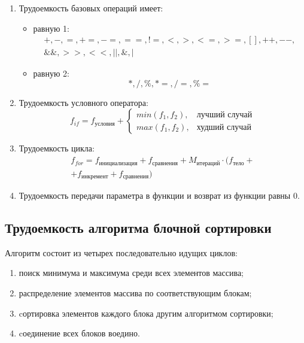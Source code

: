 \begin{enumerate}[label={\arabic*)}]
	\item Трудоемкость базовых операций имеет:
	\begin{itemize}[label=---]
		\item равную 1:
		\begin{equation}
			\label{for:operations_1}
			\begin{gathered}
				+, -, =, +=, -=, ==, !=, <, >, <=, >=, [], ++, {-}-,\\
				\&\&, >>, <<, ||, \&, |
			\end{gathered}
		\end{equation}
		\item равную 2:
		\begin{equation}
			\label{for:operations_2}
			*, /, \%, *=, /=, \%=
		\end{equation}
	\end{itemize}
	\item Трудоемкость условного оператора:
	\begin{equation}
		\label{for:if}
		f_{if} = f_{\text{условия}} + 
		\begin{cases}
			min(f_1, f_2), & \text{лучший случай}\\
			max(f_1, f_2), & \text{худший случай}
		\end{cases}
	\end{equation}
	\item Трудоемкость цикла:
	\begin{equation}
		\label{for:for}
		\begin{gathered}
			f_{for} = f_{\text{инициализация}} + f_{\text{сравнения}} + M_{\text{итераций}} \cdot (f_{\text{тело}} +\\
			+ f_{\text{инкремент}} + f_{\text{сравнения}})
		\end{gathered}
	\end{equation}
	\item Трудоемкость передачи параметра в функции и возврат из функции равны 0.
\end{enumerate}

\clearpage

\subsection{Трудоемкость алгоритма блочной сортировки}

Алгоритм состоит из четырех последовательно идущих циклов:

\begin{enumerate}[label={\arabic*)}]
	\item поиск минимума и максимума среди всех элементов массива;
	\item распределение элементов массива по соответствующим блокам;
	\item cортировка элементов каждого блока другим алгоритмом сортировки;
	\item cоединение всех блоков воедино.
\end{enumerate}

